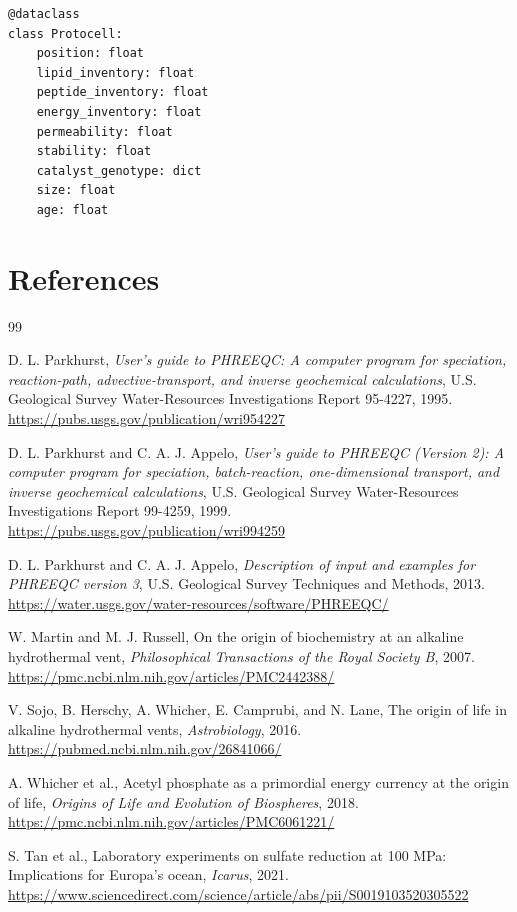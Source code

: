 \documentclass[11pt]{article}
\begin{document}
\begin{verbatim}
@dataclass
class Protocell:
    position: float
    lipid_inventory: float
    peptide_inventory: float
    energy_inventory: float
    permeability: float
    stability: float
    catalyst_genotype: dict
    size: float
    age: float
\end{verbatim}

\section{References}

\begin{thebibliography}{99}

D. L. Parkhurst,
\emph{User's guide to PHREEQC: A computer program for speciation, reaction-path,
advective-transport, and inverse geochemical calculations},
U.S. Geological Survey Water-Resources Investigations Report 95-4227, 1995.
\url{https://pubs.usgs.gov/publication/wri954227}

D. L. Parkhurst and C. A. J. Appelo,
\emph{User's guide to PHREEQC (Version 2): A computer program for speciation,
batch-reaction, one-dimensional transport, and inverse geochemical calculations},
U.S. Geological Survey Water-Resources Investigations Report 99-4259, 1999.
\url{https://pubs.usgs.gov/publication/wri994259}

D. L. Parkhurst and C. A. J. Appelo,
\emph{Description of input and examples for PHREEQC version 3},
U.S. Geological Survey Techniques and Methods, 2013.
\url{https://water.usgs.gov/water-resources/software/PHREEQC/}

W. Martin and M. J. Russell,
On the origin of biochemistry at an alkaline hydrothermal vent,
\emph{Philosophical Transactions of the Royal Society B}, 2007.
\url{https://pmc.ncbi.nlm.nih.gov/articles/PMC2442388/}

V. Sojo, B. Herschy, A. Whicher, E. Camprubi, and N. Lane,
The origin of life in alkaline hydrothermal vents,
\emph{Astrobiology}, 2016.
\url{https://pubmed.ncbi.nlm.nih.gov/26841066/}

A. Whicher et al.,
Acetyl phosphate as a primordial energy currency at the origin of life,
\emph{Origins of Life and Evolution of Biospheres}, 2018.
\url{https://pmc.ncbi.nlm.nih.gov/articles/PMC6061221/}

S. Tan et al.,
Laboratory experiments on sulfate reduction at 100 MPa: Implications for Europa's ocean,
\emph{Icarus}, 2021.
\url{https://www.sciencedirect.com/science/article/abs/pii/S0019103520305522}


\end{thebibliography}
\end{document}
